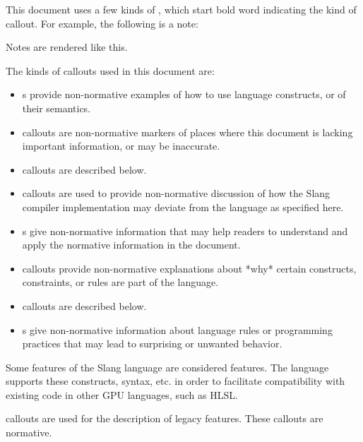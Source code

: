 
This document uses a few kinds of , which start bold word indicating the kind of callout. For example, the following is a note:

\begin{Note}
Notes are rendered like this.
\end{Note}

The kinds of callouts used in this document are:

\begin{itemize}
    \item{s provide non-normative examples of how to use language constructs, or of their semantics.}
    \item{ callouts are non-normative markers of places where this document is lacking important information, or may be inaccurate.}
    \item{ callouts are described below.}
    \item{ callouts are used to provide non-normative discussion of how the Slang compiler implementation may deviate from the language as specified here.}
    \item{s give non-normative information that may help readers to understand and apply the normative information in the document.}
    \item{ callouts provide non-normative explanations about *why* certain constructs, constraints, or rules are part of the language.}
    \item{ callouts are described below.}
    \item{s give non-normative information about language rules or programming practices that may lead to surprising or unwanted behavior.}
\end{itemize}


Some features of the Slang language are considered  features.
The language supports these constructs, syntax, etc. in order to facilitate compatibility with existing code in other GPU languages, such as HLSL.

 callouts are used for the description of legacy features. These callouts are normative.


